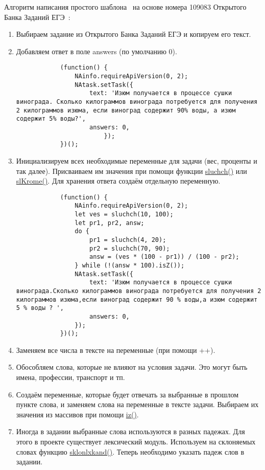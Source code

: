 Алгоритм написания простого шаблона~\cite{chasi} на основе номера 109083 Открытого Банка Заданий ЕГЭ~\cite{fipi}:
\begin{enumerate}
    \item Выбираем задание из Открытого Банка Заданий ЕГЭ и копируем его текст.
    \item Добавляем ответ в поле answers (по умолчанию 0).
          \begin{lstlisting}
            (function() {
                NAinfo.requireApiVersion(0, 2);
                NAtask.setTask({
                    text: 'Изюм получается в процессе сушки винограда. Сколько килограммов винограда потребуется для получения 2 килограммов изюма, если виноград содержит 90% воды, а изюм содержит 5% воды?',
                    answers: 0,
                        });
            })();
        \end{lstlisting}
    \item Инициализируем всех необходимые переменные для задачи (вес, проценты и так далее).
          Присваиваем им значения при помощи функции \hyperlink{sluchch}{sluchch()} или
          \hyperlink{slKrome}{slKrome()}. Для хранения ответа создаём отдельную переменную.
          \begin{lstlisting}     
            (function() {
                NAinfo.requireApiVersion(0, 2);
                let ves = sluchch(10, 100);
                let pr1, pr2, answ;
                do {
                    pr1 = sluchch(4, 20);
                    pr2 = sluchch(70, 90);
                    answ = (ves * (100 - pr1)) / (100 - pr2);
                } while (!(answ * 100).isZ());
                NAtask.setTask({
                    text: 'Изюм получается в процессе сушки винограда.Сколько килограммов винограда потребуется для получения 2 килограммов изюма,если виноград содержит 90 % воды,а изюм содержит 5 % воды ? ',
                    answers: 0,
                });
            })();            
            \end{lstlisting}
    \item Заменяем все числа в тексте на переменные (при помощи ++).
    \item Обособляем слова, которые не влияют на условия задачи. Это могут быть имена, профессии, транспорт и тп.
    \item Создаём переменные, которые будет отвечать за выбранные в прошлом пункте слова, и заменяем слова на переменные в тексте задачи.
          Выбираем их значения из массивов при помощи \hyperlink{iz}{iz()}.
    \item Иногда в задании выбранные слова используются в разных падежах. Для этого в проекте существует лексический модуль. Используем на склоняемых словах функцию \hyperlink{sklonlxkand}{sklonlxkand()}. Теперь необходимо указать падеж слов в задании.

\end{enumerate}
